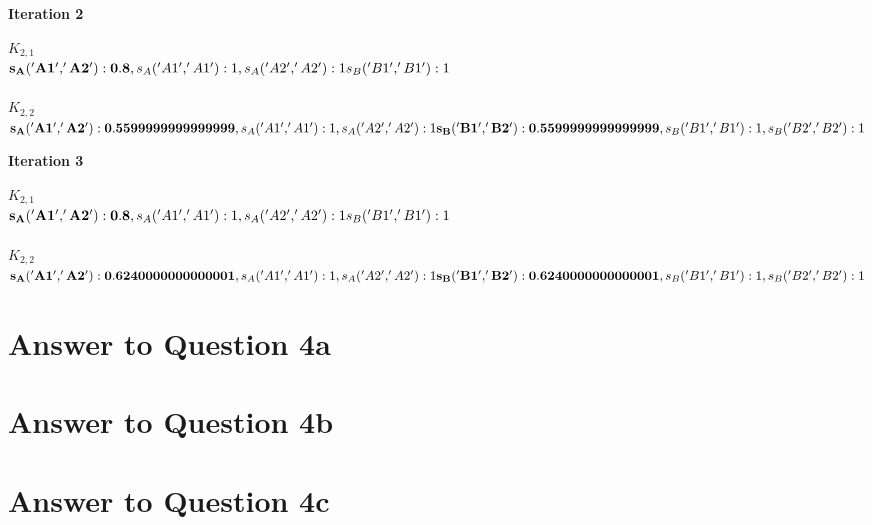 \documentclass[11pt]{article}
\begin{document}
{\textbf{Iteration 2}
\begin{multicols}{2}
$K_{2,1}$\\
$\mathbf{s_A('A1', 'A2'): 0.8},\\
s_A('A1', 'A1'): 1,\\
s_A('A2', 'A2'): 1\\
s_B('B1', 'B1'): 1$\\
\columnbreak \\
$K_{2,2}$\\
$\mathbf{s_A('A1', 'A2'): 0.5599999999999999},\\
s_A('A1', 'A1'): 1,\\
s_A('A2', 'A2'): 1\\
\mathbf{s_B('B1', 'B2'): 0.5599999999999999},\\
s_B('B1', 'B1'): 1,\\
s_B('B2', 'B2'): 1$
\end{multicols}

\textbf{Iteration 3}
\begin{multicols}{2}
$K_{2,1}$\\
$\mathbf{s_A('A1', 'A2'): 0.8},\\
s_A('A1', 'A1'): 1,\\
s_A('A2', 'A2'): 1\\
s_B('B1', 'B1'): 1$\\
\columnbreak \\
$K_{2,2}$\\
$\mathbf{s_A('A1', 'A2'): 0.6240000000000001},\\
s_A('A1', 'A1'): 1,\\
s_A('A2', 'A2'): 1\\
\mathbf{s_B('B1', 'B2'): 0.6240000000000001},\\
s_B('B1', 'B1'): 1,\\
s_B('B2', 'B2'): 1$
\end{multicols}


\pagebreak[4]
\section*{Answer to Question 4a}


\pagebreak[4]
\section*{Answer to Question 4b}

\pagebreak[4]
\section*{Answer to Question 4c}


}
\end{document}
